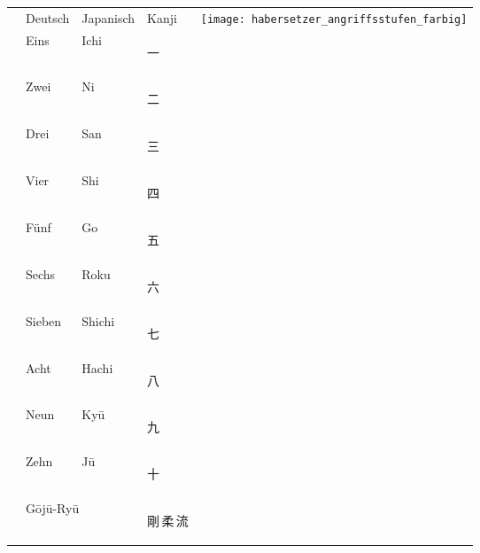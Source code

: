 	\setcounter{num}{10}\setcounter{numz}{0}
	\null\vfill\null	
	\begin{tabularx}{\textwidth}{lllll}		
		& Deutsch 	& Japanisch 	& Kanji &\multirow{13}{*}{\qquad\texttt{[image: habersetzer\_angriffsstufen\_farbig]}}\\
		\cmidrule{2-4}
		\ctuz 	& Eins 				& Ichi 					& \begin{CJK*}{UTF8}{ipxm}\color{Navy}一\end{CJK*} 	& \\
		\ctuz 	& Zwei 				& Ni 					& \begin{CJK*}{UTF8}{ipxm}\color{Navy}二\end{CJK*} 	& \\ 
		\ctuz 	& Drei 				& San 					& \begin{CJK*}{UTF8}{ipxm}\color{Navy}三\end{CJK*} 	& \\
		\ctuz 	& Vier 				& Shi 					& \begin{CJK*}{UTF8}{ipxm}\color{Navy}四\end{CJK*} 	& \\
		\ctuz 	& Fünf 				& Go 					& \begin{CJK*}{UTF8}{ipxm}\color{Navy}五\end{CJK*} 	& \\
		\ctuz 	& Sechs 			& Roku 					& \begin{CJK*}{UTF8}{ipxm}\color{Navy}六\end{CJK*} 	& \\
		\ctuz 	& Sieben 			& Shichi 				& \begin{CJK*}{UTF8}{ipxm}\color{Navy}七\end{CJK*} 	& \\
		\ctuz 	& Acht 				& Hachi 				& \begin{CJK*}{UTF8}{ipxm}\color{Navy}八\end{CJK*} 	& \\
		\ctuz 	& Neun 				& Ky\={u} 					& \begin{CJK*}{UTF8}{ipxm}\color{Navy}九\end{CJK*} 	& \\
		\ctuz 	& Zehn 				& J\={u} 					& \begin{CJK*}{UTF8}{ipxm}\color{Navy}十\end{CJK*} 	& \\
		\addlinespace
		& \multicolumn{2}{l}{G\={o}j\={u}-Ry\={u}}	& {\LARGE \begin{CJK*}{UTF8}{ipxm}\color{GKD}剛\,柔\,流\end{CJK*}}        & \\ 	

\end{tabularx}
